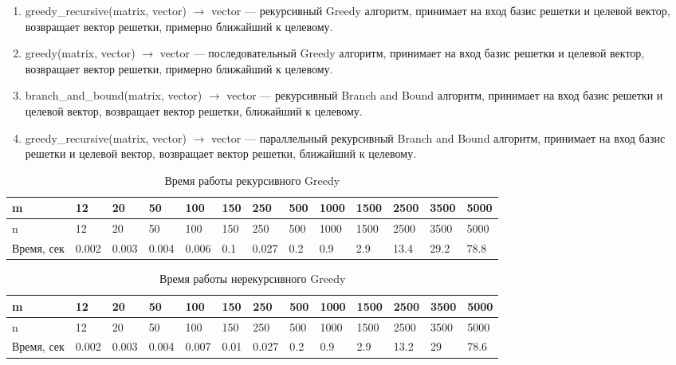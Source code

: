 \begin{enumerate}

\item greedy\_recursive(matrix, vector) $ \rightarrow $ vector --- рекурсивный Greedy алгоритм, принимает на вход базис решетки и целевой вектор, возвращает вектор решетки, примерно ближайший к целевому.

\item greedy(matrix, vector) $ \rightarrow $ vector --- последовательный Greedy алгоритм, принимает на вход базис решетки и целевой вектор, возвращает вектор решетки, примерно ближайший к целевому.

\item branch\_and\_bound(matrix, vector) $ \rightarrow $ vector --- рекурсивный Branch and Bound алгоритм, принимает на вход базис решетки и целевой вектор, возвращает вектор решетки, ближайший к целевому.

\item greedy\_recursive(matrix, vector) $ \rightarrow $ vector --- параллельный рекурсивный Branch and Bound алгоритм, принимает на вход базис решетки и целевой вектор, возвращает вектор решетки, ближайший к целевому.

\end{enumerate}


\begin{table}[H]
  \caption{Время работы рекурсивного Greedy}
  \centering
  \begin{tabular}{ | l | l | l | l | l | l | l | l | l | l | l | l | l | }
  \hline
  m & 12 & 20 & 50 & 100 & 150 & 250 & 500 & 1000 & 1500 & 2500 & 3500 & 5000 \\ \hline
  n & 12 & 20 & 50 & 100 & 150 & 250 & 500 & 1000 & 1500 & 2500 & 3500 & 5000 \\ \hline
  Время, сек & 0.002 & 0.003 & 0.004 & 0.006 & 0.1 & 0.027 & 0.2 & 0.9 & 2.9 & 13.4 & 29.2 & 78.8 \\ \hline
  \end{tabular}
  \label{table:Greedy_recursive}
\end{table}

\begin{table}[H]
  \caption{Время работы нерекурсивного Greedy}
  \centering
  \begin{tabular}{ | l | l | l | l | l | l | l | l | l | l | l | l | l | }
  \hline
  m & 12 & 20 & 50 & 100 & 150 & 250 & 500 & 1000 & 1500 & 2500 & 3500 & 5000 \\ \hline
  n & 12 & 20 & 50 & 100 & 150 & 250 & 500 & 1000 & 1500 & 2500 & 3500 & 5000 \\ \hline
  Время, сек & 0.002 & 0.003 & 0.004 & 0.007 & 0.01 & 0.027 & 0.2 & 0.9 & 2.9 & 13.2 & 29 & 78.6 \\ \hline
  \end{tabular}
  \label{table:Greedy}
\end{table}

